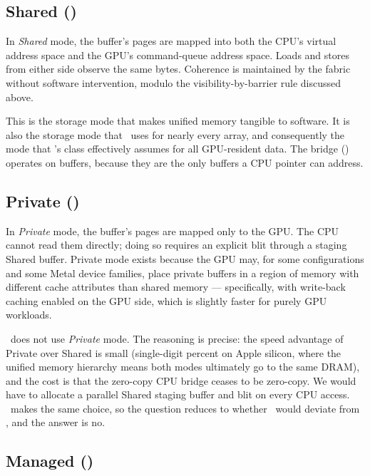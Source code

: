 \subsection{Shared ()}
\label{ssec:unified_memory:shared}

In \emph{Shared} mode, the buffer's pages are mapped into both the
CPU's virtual address space and the GPU's command-queue address
space. Loads and stores from either side observe the same bytes.
Coherence is maintained by the fabric without software intervention,
modulo the visibility-by-barrier rule discussed above.

This is the storage mode that makes unified memory tangible to
software. It is also the storage mode that \MLX\ uses for nearly
every array, and consequently the mode that \Lucid's 
class effectively assumes for all GPU-resident data. The
 bridge ()
operates on  buffers, because they are
the only buffers a CPU pointer can address.

\subsection{Private ()}
\label{ssec:unified_memory:private}

In \emph{Private} mode, the buffer's pages are mapped only to the
GPU. The CPU cannot read them directly; doing so requires an
explicit blit through a staging Shared buffer. Private mode exists
because the GPU may, for some configurations and some Metal device
families, place private buffers in a region of memory with different
cache attributes than shared memory --- specifically, with
write-back caching enabled on the GPU side, which is slightly faster
for purely GPU workloads.

\Lucid\ does not use \emph{Private} mode. The reasoning is precise:
the speed advantage of Private over Shared is small (single-digit
percent on Apple silicon, where the unified memory hierarchy means
both modes ultimately go to the same DRAM), and the cost is that the
zero-copy CPU bridge ceases to be zero-copy. We would have to
allocate a parallel Shared staging buffer and blit on every CPU
access. \MLX\ makes the same choice, so the question reduces to
whether \Lucid\ would deviate from \MLX, and the answer is no.

\subsection{Managed ()}
\label{ssec:unified_memory:managed}

